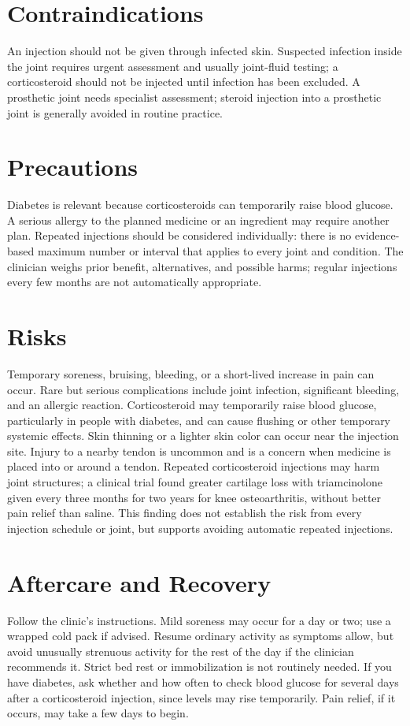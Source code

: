 \section*{Contraindications}
An injection should not be given through infected skin. Suspected infection inside the joint requires urgent assessment and usually joint-fluid testing; a corticosteroid should not be injected until infection has been excluded. A prosthetic joint needs specialist assessment; steroid injection into a prosthetic joint is generally avoided in routine practice.

\section*{Precautions}
Diabetes is relevant because corticosteroids can temporarily raise blood glucose. A serious allergy to the planned medicine or an ingredient may require another plan. Repeated injections should be considered individually: there is no evidence-based maximum number or interval that applies to every joint and condition. The clinician weighs prior benefit, alternatives, and possible harms; regular injections every few months are not automatically appropriate.

\section*{Risks}
Temporary soreness, bruising, bleeding, or a short-lived increase in pain can occur. Rare but serious complications include joint infection, significant bleeding, and an allergic reaction. Corticosteroid may temporarily raise blood glucose, particularly in people with diabetes, and can cause flushing or other temporary systemic effects. Skin thinning or a lighter skin color can occur near the injection site. Injury to a nearby tendon is uncommon and is a concern when medicine is placed into or around a tendon. Repeated corticosteroid injections may harm joint structures; a clinical trial found greater cartilage loss with triamcinolone given every three months for two years for knee osteoarthritis, without better pain relief than saline. This finding does not establish the risk from every injection schedule or joint, but supports avoiding automatic repeated injections.

\section*{Aftercare and Recovery}
Follow the clinic's instructions. Mild soreness may occur for a day or two; use a wrapped cold pack if advised. Resume ordinary activity as symptoms allow, but avoid unusually strenuous activity for the rest of the day if the clinician recommends it. Strict bed rest or immobilization is not routinely needed. If you have diabetes, ask whether and how often to check blood glucose for several days after a corticosteroid injection, since levels may rise temporarily. Pain relief, if it occurs, may take a few days to begin.

